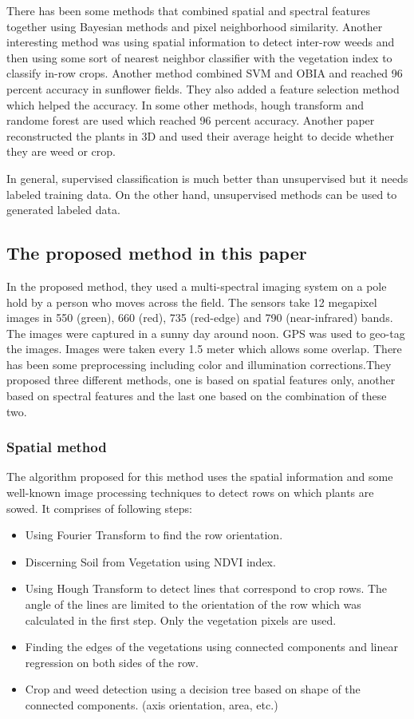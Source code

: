 \documentclass{article}
\begin{document}
	There has been some methods that combined spatial and spectral features together using Bayesian methods and pixel neighborhood similarity. Another interesting method was using spatial information to detect inter-row weeds and then using some sort of nearest neighbor classifier with the vegetation index to classify in-row crops. Another method combined SVM and OBIA and reached 96 percent accuracy in sunflower fields. They also added a feature selection method which helped the accuracy. In some other methods, hough transform and randome forest are used which reached 96 percent accuracy. Another paper reconstructed the plants in 3D and used their average height to decide whether they are weed or crop. 
	
	In general, supervised classification is much better than unsupervised but it needs labeled training data. On the other hand, unsupervised methods can be used to generated labeled data. 
	
	\subsection{The proposed method in this paper}
	
	In the proposed method, they used a multi-spectral imaging system on a pole hold by a person who moves across the field. The sensors take 12 megapixel images in 550 (green), 660 (red), 735 (red-edge) and 790 (near-infrared) bands. The images were captured in a sunny day around noon. GPS was used to geo-tag the images. Images were taken every 1.5 meter which allows some overlap. There has been some preprocessing including color and illumination corrections.They proposed three different methods, one is based on spatial features only, another based on spectral features and the last one based on the combination of these two.
	
	\subsubsection{Spatial method}
	
	The algorithm proposed for this method uses the spatial information and some well-known image processing techniques to detect rows on which plants are sowed. It comprises of following steps:
	
	\begin{itemize}
		\item Using Fourier Transform to find the row orientation.
		\item Discerning Soil from Vegetation using NDVI index. 
		\item Using Hough Transform to detect lines that correspond to crop rows. The angle of the lines are limited to the orientation of the row which was calculated in the first step. Only the vegetation pixels are used.
		\item Finding the edges of the vegetations using connected components and linear regression on both sides of the row. 
		\item Crop and weed detection using a decision tree based on shape of the connected components. (axis orientation, area, etc.)
	\end{itemize}
	
\end{document}
